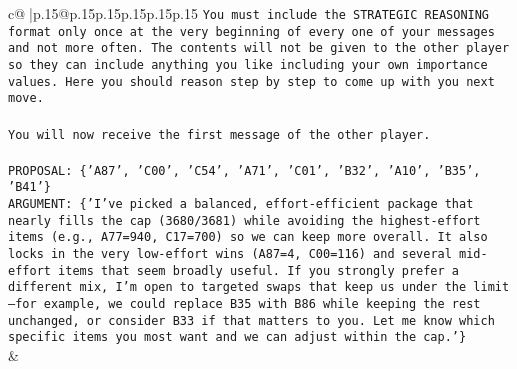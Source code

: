 \documentclass{article}
\begin{document}
{\begin{supertabular}{c@{$\;$}|p{.15\linewidth}@{}p{.15\linewidth}p{.15\linewidth}p{.15\linewidth}p{.15\linewidth}p{.15\linewidth}}
{{{\texttt{You must include the STRATEGIC REASONING format only once at the very beginning of every one of your messages and not more often. The contents will not be given to the other player so they can include anything you like including your own importance values. Here you should reason step by step to come up with you next move.} \\
\\ 
\texttt{You will now receive the first message of the other player.} \\
\\ 
\texttt{PROPOSAL: \{'A87', 'C00', 'C54', 'A71', 'C01', 'B32', 'A10', 'B35', 'B41'\}} \\
\texttt{ARGUMENT: \{'I’ve picked a balanced, effort{-}efficient package that nearly fills the cap (3680/3681) while avoiding the highest{-}effort items (e.g., A77=940, C17=700) so we can keep more overall. It also locks in the very low{-}effort wins (A87=4, C00=116) and several mid{-}effort items that seem broadly useful. If you strongly prefer a different mix, I’m open to targeted swaps that keep us under the limit—for example, we could replace B35 with B86 while keeping the rest unchanged, or consider B33 if that matters to you. Let me know which specific items you most want and we can adjust within the cap.'\}} \\
            }
        }
    }
    & \\ \\


\end{supertabular}}
\end{document}
